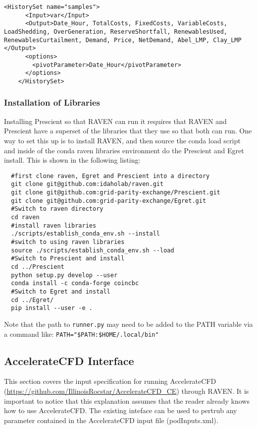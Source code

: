 \begin{lstlisting}[style=XML]
    <HistorySet name="samples">
      <Input>var</Input>
      <Output>Date_Hour, TotalCosts, FixedCosts, VariableCosts, LoadShedding, OverGeneration, ReserveShortfall, RenewablesUsed, RenewablesCurtailment, Demand, Price, NetDemand, Abel_LMP, Clay_LMP </Output>
      <options>
        <pivotParameter>Date_Hour</pivotParameter>
      </options>
    </HistorySet>
\end{lstlisting}


\subsubsection{Installation of Libraries}

Installing Prescient so that RAVEN can run it requires that RAVEN and
Prescient have a superset of the libraries that they use so that both
can run.  One way to set this up is to install RAVEN, and then source
the conda load script and inside of the conda raven libraries
environment do the Prescient and Egret install.  This is shown in the
following listing:

\begin{lstlisting}
  #first clone raven, Egret and Prescient into a directory
  git clone git@github.com:idaholab/raven.git
  git clone git@github.com:grid-parity-exchange/Prescient.git
  git clone git@github.com:grid-parity-exchange/Egret.git
  #Switch to raven directory
  cd raven
  #install raven libraries
  ./scripts/establish_conda_env.sh --install
  #switch to using raven libraries
  source ./scripts/establish_conda_env.sh --load
  #Switch to Prescient and install
  cd ../Prescient
  python setup.py develop --user
  conda install -c conda-forge coincbc
  #Switch to Egret and install
  cd ../Egret/
  pip install --user -e .
\end{lstlisting}

Note that the path to \texttt{runner.py} may need to be added to the PATH variable via a command like: \verb'PATH="$PATH:$HOME/.local/bin"'

\subsection{AccelerateCFD Interface}
\label{subsec:AccelerateCFDInterface}
This section covers the input specification for running AccelerateCFD
 (\url{https://github.com/IllinoisRocstar/AccelerateCFD_CE})
 through RAVEN. It is important to notice
that this explanation assumes that the reader already knows how to use AccelerateCFD. The existing inteface can be used to pertrub any parameter
contained in the AccelerateCFD input file (podInputs.xml).

